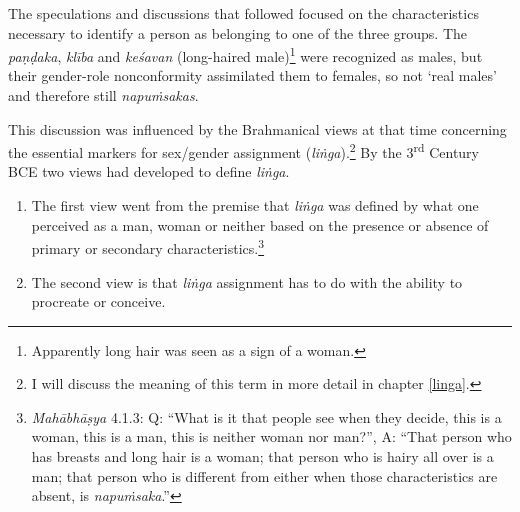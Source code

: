 The speculations and discussions that followed focused on the characteristics necessary to identify a person as belonging to one of the three groups. The \textit{paṇḍaka}, \textit{klība} and \textit{keśavan} (long-haired male)\footnote{Apparently long hair was seen as a sign of a woman.} were recognized as males, but their gender-role nonconformity assimilated them to females, so not `real males' and therefore still \textit{napuṁsakas}.

This discussion was influenced by the Brahmanical views at that time concerning the essential markers for sex/gender assignment (\textit{liṅga}).\footnote{I will discuss the meaning of this term in more detail in chapter \ref{linga}.} By the 3\textsuperscript{rd} Century BCE two views had developed to define \textit{liṅga}.

\begin{enumerate}
 \item The first view went from the premise that \textit{liṅga} was defined by what one perceived as a man, woman or neither based on the presence or absence of primary or secondary characteristics.\footnote{\textit{Mahābhāṣya} 4.1.3: Q: ``What is it that people see when they decide, this is a woman, this is a man, this is neither woman nor man?'', A: ``That person who has breasts and long hair is a woman; that person who is hairy all over is a man; that person who is different from either when those characteristics are absent, is \textit{napuṁsaka}.''}
 \item The second view is that \textit{liṅga} assignment has to do with the ability to procreate or conceive. 
\end{enumerate}

